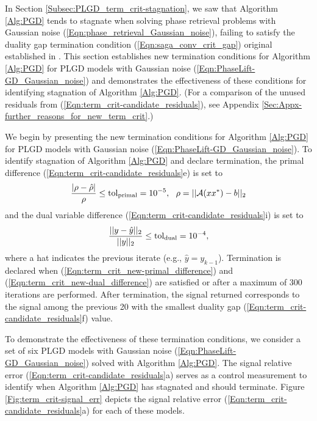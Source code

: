 In Section \ref{Subsec:PLGD_term_crit-stagnation}, we saw that Algorithm \ref{Alg:PGD} tends to stagnate when solving phase retrieval problems with Gaussian noise (\ref{Eqn:phase_retrieval_Gaussian_noise}), failing to satisfy the duality gap termination condition (\ref{Eqn:saga_conv_crit_gap}) original established in \cite{DBLP:journals/siamsc/FriedlanderM16}.  
This section establishes new termination conditions for Algorithm \ref{Alg:PGD} for PLGD models with Gaussian noise (\ref{Eqn:PhaseLift-GD_Gaussian_noise}) and demonstrates the effectiveness of these conditions for identifying stagnation of Algorithm \ref{Alg:PGD}.  
(For a comparison of the unused residuals from (\ref{Eqn:term_crit-candidate_residuals}), see Appendix \ref{Sec:Appx-further_reasons_for_new_term_crit}.)







We begin by presenting the new termination conditions for Algorithm \ref{Alg:PGD} for PLGD models with Gaussian noise (\ref{Eqn:PhaseLift-GD_Gaussian_noise}).  To identify stagnation of Algorithm \ref{Alg:PGD} and declare termination, the primal difference (\ref{Eqn:term_crit-candidate_residuals}e) is set to 
\begin{equation}
	\label{Eqn:term_crit_new-primal_difference}
\frac{| \rho - \hat{\rho} |}{\rho} \leq  \textnormal{tol}_\textnormal{primal} = 10^{-5}, \ \ \rho = ||{\mathcal A}(xx^*) - b||_2
\end{equation}
and the dual variable difference (\ref{Eqn:term_crit-candidate_residuals}i) is set to
\begin{equation}
	\label{Eqn:term_crit_new-dual_difference}
\frac{||y- \hat{y}||_2}{||y||_2} \leq \textnormal{tol}_\textnormal{dual}= 10^{-4},
\end{equation}
where a hat indicates the previous iterate (e.g., $\hat{y} = y_{k-1}$).  Termination is declared when (\ref{Eqn:term_crit_new-primal_difference}) and (\ref{Eqn:term_crit_new-dual_difference}) are satisfied or after a maximum of 300 iterations are performed.  After termination, the signal returned corresponds to the signal among the previous 20 with the smallest duality gap (\ref{Eqn:term_crit-candidate_residuals}f) value.  










To demonstrate the effectiveness of these termination conditions, we consider a set of six PLGD models with Gaussian noise (\ref{Eqn:PhaseLift-GD_Gaussian_noise}) solved with Algorithm \ref{Alg:PGD}.   The signal relative error (\ref{Eqn:term_crit-candidate_residuals}a) serves as a control measurement to identify when Algorithm \ref{Alg:PGD} has stagnated and should terminate.  Figure \ref{Fig:term_crit-signal_err} depicts the signal relative error (\ref{Eqn:term_crit-candidate_residuals}a) for each of these models.


